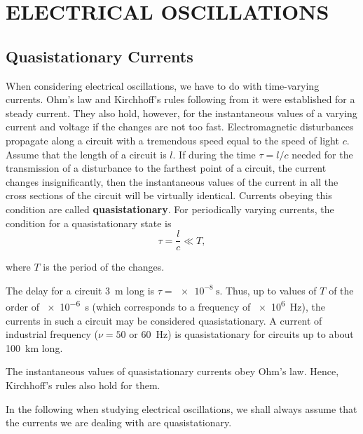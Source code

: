 

\chapter[ELECTRICAL OSCILLATIONS]{ELECTRICAL OSCILLATIONS}\label{chap:13}

\section{Quasistationary Currents}\label{sec:13_1}

When considering electrical oscillations, we have to do with time-varying currents.
Ohm's law and Kirchhoff's rules following from it were established for a steady current.
They also hold, however, for the instantaneous values of a varying current and voltage if the changes are not too fast.
Electromagnetic disturbances propagate along a circuit with a tremendous speed equal to the speed of light $c$.
Assume that the length of a circuit is $l$.
If during the time $\tau=l/c$ needed for the transmission of a disturbance to the farthest point of a circuit, the current changes insignificantly, then the instantaneous values of the current in all the cross sections of the circuit will be virtually identical.
Currents obeying this condition are called \textbf{quasistationary}.
For periodically varying currents, the condition for a
quasistationary state is
\begin{equation*}
    \tau = \frac{l}{c} \ll T,
\end{equation*}

\noindent
where $T$ is the period of the changes.

The delay for a circuit \SI{3}{\metre} long is $\tau=\SI{e-8}{\second}$.
Thus, up to values of $T$ of the order of \SI{e-6}{\second} (which corresponds to a frequency of \SI{e6}{\hertz}), the currents in such a circuit may be considered quasistationary.
A current of industrial frequency ($\nu= 50$ or \SI{60}{\hertz}) is quasistationary for circuits up to about \SI{100}{\kilo\metre} long.

The instantaneous values of quasistationary currents obey Ohm's law.
Hence, Kirchhoff's rules also hold for them.

In the following when studying electrical oscillations, we shall always assume that the currents we are dealing with are quasistationary.

